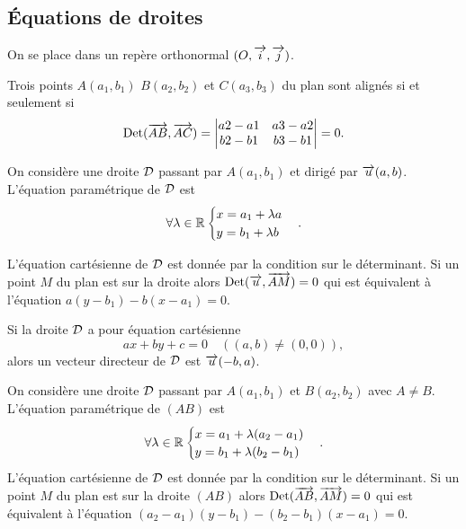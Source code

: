 \subsection{Équations de droites}

On se place dans un repère orthonormal \((O , \overrightarrow{i} , \overrightarrow{j})\).
\begin{prop}
  Trois points \(A(a_1, b_1)\) \(B(a_2, b_2)\) et \(C(a_3, b_3)\) du plan sont
  alignés si et seulement si
  \begin{equation}
    \operatorname{Det}(\overrightarrow{AB},\overrightarrow{AC})=
    \begin{vmatrix}
      a2 - a1&a3 - a2\\
      b2 - b1&b3 - b1
    \end{vmatrix} =0.
  \end{equation}
\end{prop}

\begin{prop}
  On considère une droite \(\mathcal{D}\) passant par \(A(a_1, b_1)\) et dirigé par
  \(\overrightarrow{u}(a , b)\). L'équation paramétrique de \(\mathcal{D}\) est
  \begin{equation}
    \forall \lambda \in \mathbb{R}
    \begin{cases}
      x = a_1 + \lambda a \\ y = b_1 + \lambda b
    \end{cases}.
  \end{equation}

  L'équation cartésienne de \(\mathcal{D}\) est donnée par la condition sur le
  déterminant. Si un point \(M\) du plan est sur la droite alors \(\operatorname{Det}(\overrightarrow{u} ,
  \overrightarrow{AM}) = 0\) qui est équivalent à l'équation \(a(y - b_1)-b(x - a_1) =
  0\).
\end{prop}

Si la droite \(\mathcal{D}\) a pour équation cartésienne
\begin{equation}
  ax + by + c = 0 \quad ((a , b) \neq (0 , 0)),
\end{equation}
alors un vecteur directeur de \(\mathcal{D}\) est \(\overrightarrow{u}(-b , a)\).

\begin{prop}
  On considère une droite \(\mathcal{D}\) passant par \(A(a_1 , b_1)\) et \(B(a_2 ,
  b_2)\) avec \(A \neq B\). L'équation paramétrique de \((AB)\) est
  \begin{equation}
    \forall \lambda \in \mathbb{R}
    \begin{cases}
      x = a_1 + \lambda (a_2 - a_1) \\
      y = b_1 + \lambda (b_2 - b_1)
    \end{cases}.
  \end{equation}
  L'équation cartésienne de \(\mathcal{D}\) est donnée par la condition sur le
  déterminant. Si un point \(M\) du plan est sur la droite \((AB)\) alors
  \(\operatorname{Det}(\overrightarrow{AB},\overrightarrow{AM}) = 0\) qui est équivalent à l'équation \((a_2 -
  a_1)(y - b_1)-(b_2 - b_1)(x - a_1) = 0\).
\end{prop}

